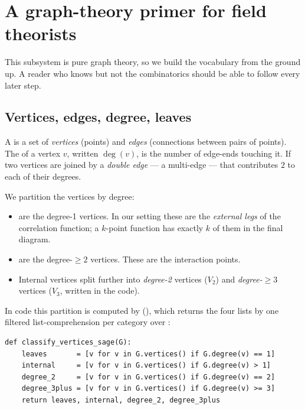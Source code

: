 \section{A graph-theory primer for field theorists}

This subsystem is pure graph theory, so we build the vocabulary from the ground
up. A reader who knows \msrjd{} but not the combinatorics should be able to
follow every later step.

\subsection{Vertices, edges, degree, leaves}

A  is a set of \emph{vertices} (points) and \emph{edges}
(connections between pairs of points). The  of a vertex $v$, written
$\deg(v)$, is the number of edge-ends touching it. If two vertices are joined by
a \emph{double edge} --- a multi-edge --- that contributes $2$ to each of their
degrees.

We partition the vertices by degree:

\begin{itemize}
  \item {} are the degree-1 vertices. In our setting these are the
        \emph{external legs} of the correlation function; a $k$-point function has
        exactly $k$ of them in the final diagram.
  \item {} are the degree-$\ge 2$ vertices. These are the
        interaction points.
  \item Internal vertices split further into \emph{degree-2} vertices ($V_2$) and
        \emph{degree-$\ge 3$} vertices ($V_3$, written  in the
        code).
\end{itemize}

In code this partition is computed by 
(), which returns the four lists
 by one filtered
list-comprehension per category over :

\begin{lstlisting}
def classify_vertices_sage(G):
    leaves       = [v for v in G.vertices() if G.degree(v) == 1]
    internal     = [v for v in G.vertices() if G.degree(v) > 1]
    degree_2     = [v for v in G.vertices() if G.degree(v) == 2]
    degree_3plus = [v for v in G.vertices() if G.degree(v) >= 3]
    return leaves, internal, degree_2, degree_3plus
\end{lstlisting}


